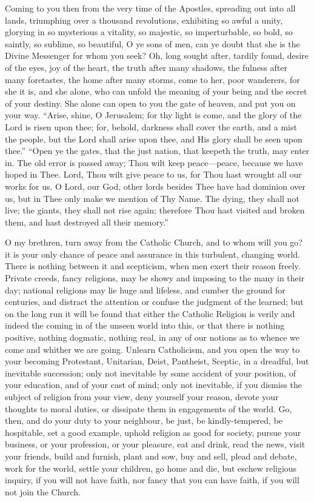 Coming to you then from the very time of the Apostles, spreading
out into all lands, triumphing over a thousand revolutions, exhibiting
so awful a unity, glorying in so mysterious a vitality, so majestic,
so imperturbable, so bold, so saintly, so sublime, so beautiful, O ye
sons of men, can ye doubt that she is the Divine Messenger for whom
you seek? Oh, long sought after, tardily found, desire of the eyes,
joy of the heart, the truth after many shadows, the fulness after many
foretastes, the home after many storms, come to her, poor wanderers,
for she it is, and she alone, who can unfold the meaning of your being
and the secret of your destiny. She alone can open to you the gate of
heaven, and put you on your way. ``Arise, shine, O Jerusalem; for
thy light is come, and the glory of the Lord is risen upon thee; for,
behold, darkness shall cover the earth, and a mist the people, but the
Lord shall arise upon thee, and His glory shall be seen upon
thee.'' ``Open ye the gates, that the just nation, that
keepeth the truth, may enter in. The old error is passed away; Thou
wilt keep peace—peace, because we have hoped in Thee. Lord, Thou
wilt give peace to us, for Thou hast wrought all our works for us. O
Lord, our God, other lords besides Thee have had dominion over us, but
in Thee only make we mention of Thy Name. The dying, they shall not
live; the giants, they shall not rise again; therefore Thou hast
visited and broken them, and hast destroyed all their memory.''

O my brethren, turn away from the Catholic Church, and to whom will
you go? it is your only chance of peace and assurance in this
turbulent, changing world. There is nothing between it and scepticism,
when men exert their reason freely. Private creeds, fancy religions,
may be showy and imposing to the many in their day; national religions
may lie huge and lifeless, and cumber the ground for centuries, and
distract the attention or confuse the judgment of the learned; but on
the long run it will be found that either the Catholic Religion is
verily and indeed the coming in of the unseen world into this, or that
there is nothing positive, nothing dogmatic, nothing real, in any of
our notions as to whence we come and whither we are going. Unlearn
Catholicism, and you open the way to your becoming Protestant,
Unitarian, Deist, Pantheist, Sceptic, in a dreadful, but inevitable
succession; only not inevitable by some accident of your position, of
your education, and of your cast of mind; only not inevitable, if you
dismiss the subject of religion from your view, deny yourself your
reason, devote your thoughts to moral duties, or dissipate them in
engagements of the world. Go, then, and do your duty to your neighbour,
be just, be kindly-tempered, be hospitable, set a good example, uphold
religion as good for society, pursue your business, or your
profession, or your pleasure, eat and drink, read the news, visit your
friends, build and furnish, plant and sow, buy and sell, plead and
debate, work for the world, settle your children, go home and die, but
eschew religious inquiry, if you will not have faith, nor fancy that
you can have faith, if you will not join the Church.

